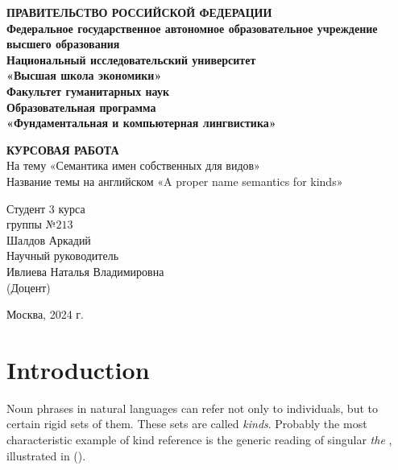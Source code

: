 \documentclass[a4paper, 12pt]{article}
\begin{document}

\thispagestyle{empty}
\begin{center}
\noindent  \textbf{ПРАВИТЕЛЬСТВО РОССИЙСКОЙ ФЕДЕРАЦИИ}\\
\textbf{Федеральное государственное автономное образовательное учреждение высшего образования}\\

\textbf{Национальный исследовательский университет}\\
\textbf{«Высшая школа экономики»}\\
\textbf{Факультет гуманитарных наук}\bigskip\\

\textbf{Образовательная программа}\\
\textbf{«Фундаментальная и компьютерная лингвистика»}\\
\vfill


\textbf{КУРСОВАЯ РАБОТА}\\

На тему «Семантика имен собственных для видов»\\
Название темы на английском  «A proper name semantics for kinds»\\
\vfill
\vfill
\begin{flushright}
Студент $3$ курса\\
группы №$213$ \\
Шалдов Аркадий\bigskip\\
                       
Научный руководитель\\
Ивлиева Наталья Владимировна\\
(Доцент)
\end{flushright}
\vfill
\begin{center}
Москва, 2024 г.
\end{center}

\end{center}
\pagebreak

\tableofcontents
\pagebreak

\section{Introduction}

Noun phrases in natural languages can refer not only to individuals, but to certain rigid sets of them. These sets are called \emph{kinds}. Probably the most characteristic example of kind reference is the generic reading of singular \textit{the} \parencite{carlson1977referencekindsenglish}, illustrated in (\nextx).
\end{document}
